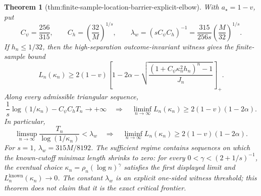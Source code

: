 \documentclass{article}
\newtheorem{theorem}{Theorem}
\begin{document}
\begin{theorem}[thm:finite-sample-location-barrier-explicit-elbow]\label{thm:finite-sample-location-barrier-explicit-elbow}
With \(a_\star=1-v\), put
\[
C_\psi=\frac{256}{315},
\qquad
C_h=\left(\frac{32}{M}\right)^{1/s},
\qquad
\lambda_w=(sC_\psi C_h)^{-1}
=\frac{315}{256s}\left(\frac{M}{32}\right)^{1/s}.
\]
If \(h_n\le1/32\), then the high-separation outcome-invariant witness gives the finite-sample bound
\[
L_n(\kappa_n)
\ge2(1-v)\left[
1-2\alpha-
\sqrt{\frac{\left(1+C_\psi\kappa_n^2h_n\right)^n-1}{J_n}}
\right]_+.
\]
Along every admissible triangular sequence,
\[
\frac1s\log(1/\kappa_n)-C_\psi C_hT_n\longrightarrow+\infty
\quad\Longrightarrow\quad
\liminf_{n\to\infty}L_n(\kappa_n)
\ge2(1-v)(1-2\alpha).
\]
In particular,
\[
\limsup_{n\to\infty}
\frac{T_n}{\log(1/\kappa_n)}<\lambda_w
\quad\Longrightarrow\quad
\liminf_{n\to\infty}L_n(\kappa_n)
\ge2(1-v)(1-2\alpha).
\]
For \(s=1\), \(\lambda_w=315M/8192\).  The sufficient regime contains sequences on which the known-cutoff minimax length shrinks to zero: for every \(0<\gamma<(2+1/s)^{-1}\), the eventual choice \(\kappa_n=\rho_n(\log n)^\gamma\) satisfies the first displayed limit and \(L_n^{\mathrm{known}}(\kappa_n)\to0\).  The constant \(\lambda_w\) is an explicit one-sided witness threshold; this theorem does not claim that it is the exact critical frontier.
\end{theorem}
\end{document}
